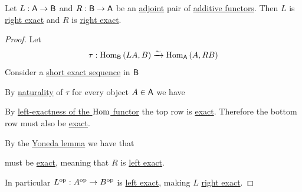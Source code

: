 \documentclass[../../../main]{subfiles}
\begin{document}
\begin{theorem} \label{thm:adjointness-and-exactness}
  Let \(L: \mathsf{A} \to \mathsf{B}\) and \(R: \mathsf{B} \to \mathsf{A}\) be an \hyperref[def:adjoint-functors]{adjoint} pair of \hyperref[def:additive-functor]{additive functors}.
  Then \(L\) is \hyperref[def:exact-complex-functor]{right exact} and \(R\) is \hyperref[def:exact-complex-functor]{right exact}.
\end{theorem}
\begin{proof}
  Let
  \begin{equation*}
    \tau: \operatorname{Hom}_{\mathsf{B}} \left( LA, B \right) \xrightarrow{\sim} \operatorname{Hom}_{\mathsf{A}} \left( A, RB \right)
  \end{equation*}
  Consider a \hyperref[def:short-exact-sequence]{short exact sequence} in \(\mathsf{B}\)
  \begin{center}
  \end{center}
  By \hyperref[def:natural-transformation]{naturality} of \(\tau\) for every object \(A \in \mathsf{A}\) we have
  \begin{center}
  \end{center}

  By \hyperref[ex:hom-left-exact]{left-exactness of the \(\operatorname{Hom}\) functor} the top row is \hyperref[def:short-exact-sequence]{exact}.
  Therefore the bottom row must also be \hyperref[def:short-exact-sequence]{exact}.

  By the \hyperref[thm:yoneda-lemma]{Yoneda lemma} we have that
  \begin{center}
  \end{center}
  must be \hyperref[def:short-exact-sequence]{exact}, meaning that \(R\) is \hyperref[def:exact-complex-functor]{left exact}.

  In particular \(L^{\operatorname*{op}}: A^{\operatorname*{op}} \to B^{\operatorname*{op}}\) is \hyperref[def:exact-complex-functor]{left exact}, making \(L\) \hyperref[def:exact-complex-functor]{right exact}.
\end{proof}
\end{document}
